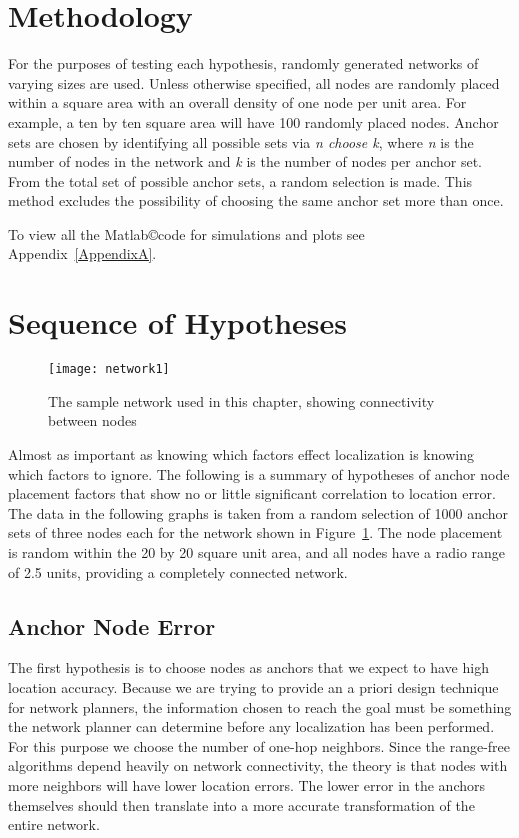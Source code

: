 \section{Methodology}
For the purposes of testing each hypothesis, randomly generated networks of varying sizes are used.  Unless otherwise specified, all nodes are randomly placed within a square area with an overall density of one node per unit area.  For example, a ten by ten square area will have 100 randomly placed nodes.  Anchor sets are chosen by identifying all possible sets via \emph{n choose k}, where \emph{n} is the number of nodes in the network and \emph{k} is the number of nodes per anchor set.  From the total set of possible anchor sets, a random selection is made.  This method excludes the possibility of choosing the same anchor set more than once.

To view all the Matlab\copyright code for simulations and plots see Appendix~\ref{AppendixA}.

\section{Sequence of Hypotheses}
\begin{figure}
	\centering
		\texttt{[image: network1]}
	\caption{The sample network used in this chapter, showing connectivity between nodes}
	\label{fig:HypothesesNetwork}
\end{figure}

Almost as important as knowing which factors effect localization is knowing which factors to ignore. The following is a summary of hypotheses of anchor node placement factors that show no or little significant correlation to location error.  The data in the following graphs is taken from a random selection of 1000 anchor sets of three nodes each for the network shown in Figure~\ref{fig:HypothesesNetwork}.  The node placement is random within the 20 by 20 square unit area, and all nodes have a radio range of 2.5 units, providing a completely connected network.

\subsection{Anchor Node Error}
The first hypothesis is to choose nodes as anchors that we expect to have high location accuracy. Because we are trying to provide an a priori design technique for network planners, the information chosen to reach the goal must be something the network planner can determine before any localization has been performed.  For this purpose we choose the number of one-hop neighbors.  Since the range-free algorithms depend heavily on network connectivity, the theory is that nodes with more neighbors will have lower location errors.  The lower error in the anchors themselves should then translate into a more accurate transformation of the entire network.

